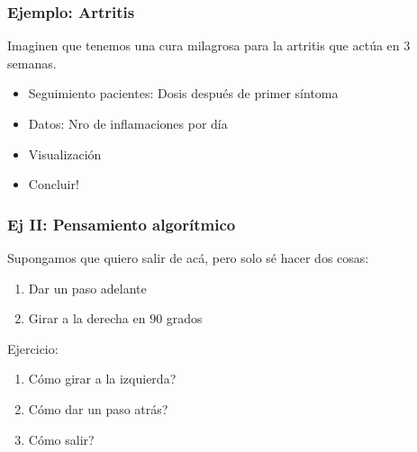 \documentclass[14pt,aspectratio=169,xcolor=dvipsnames]{beamer}
\begin{document}
\begin{frame}[t]\frametitle{Ejemplo: Artritis}
Imaginen que tenemos una cura milagrosa para la artritis que actúa en 3 semanas. 
\begin{itemize}
    \item<1-> Seguimiento pacientes: Dosis después de primer síntoma
    \item<2-> Datos: Nro de inflamaciones por día
    \item<3-> Visualización
    \item<4-> Concluir!
\end{itemize}
\end{frame}
\begin{frame}\frametitle{Ej II: Pensamiento algorítmico}
Supongamos que quiero salir de acá, pero solo sé hacer dos cosas: 
    \begin{enumerate}
        \item Dar un paso adelante
        \item Girar a la derecha en $90$ grados
    \end{enumerate}

\vspace{1cm}
Ejercicio:
    \begin{enumerate}
        \item<+-> Cómo girar a la izquierda?
        \item<+-> Cómo dar un paso atrás?
        \item<+-> Cómo salir?
    \end{enumerate}
\end{frame}
\end{document}
